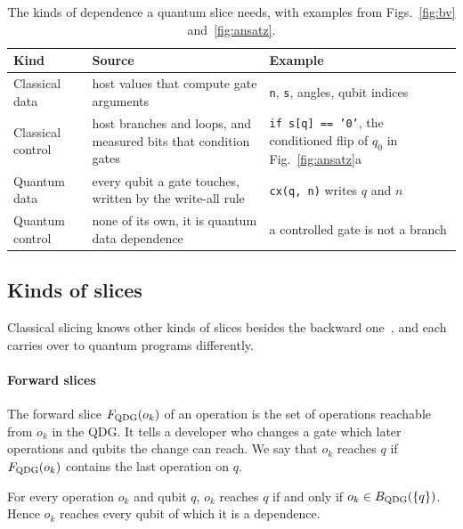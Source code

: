 \begin{table}[t]
  \centering
  \caption{The kinds of dependence a quantum slice needs, with examples from Figs.~\ref{fig:bv} and~\ref{fig:ansatz}.}
  \label{tab:kinds}
  \footnotesize\setlength{\tabcolsep}{3pt}
  \begin{tabular}{@{}>{\raggedright\arraybackslash}p{1.75cm} >{\raggedright\arraybackslash}p{3.05cm} >{\raggedright\arraybackslash}p{3.05cm}@{}}
    \toprule
    Kind & Source & Example \\
    \midrule
    Classical data & host values that compute gate arguments & \texttt{n}, \texttt{s}, angles, qubit indices \\
    Classical control & host branches and loops, and measured bits that condition gates & \texttt{if s[q] == '0'}, the conditioned flip of $q_0$ in Fig.~\ref{fig:ansatz}a \\
    Quantum data & every qubit a gate touches, written by the write-all rule & \texttt{cx(q, n)} writes $q$ and $n$ \\
    \midrule
    Quantum control & none of its own, it is quantum data dependence & a controlled gate is not a branch \\
    \bottomrule
  \end{tabular}
\end{table}

\subsection{Kinds of slices}
Classical slicing knows other kinds of slices besides the backward one~\cite{tip1994a, silva2012vocabulary},
and each carries over to quantum programs differently.

\paragraph*{Forward slices}
The forward slice $F_{\mathrm{QDG}}(o_k)$ of an operation is the set of operations reachable from $o_k$ in the QDG. It
tells a developer who changes a gate which later operations and qubits the change can reach. We say that
$o_k$ reaches $q$ if $F_{\mathrm{QDG}}(o_k)$ contains the last operation on $q$.

\begin{proposition}\label{prop:dual}
For every operation $o_k$ and qubit $q$, $o_k$ reaches $q$ if and only if $o_k \in B_{\mathrm{QDG}}(\{q\})$. Hence
$o_k$ reaches every qubit of which it is a dependence.
\end{proposition}

